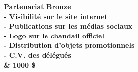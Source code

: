 \bf Partenariat Bronze\\
- Visibilité sur le site internet\\
- Publications sur les médias sociaux\\
- Logo sur le chandail officiel\\
- Distribution d'objets promotionnels\\
- C.V. des délégués\\
& 1000 \$\\
